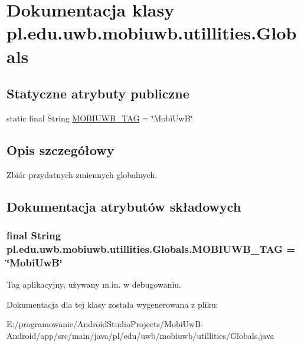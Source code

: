 \hypertarget{classpl_1_1edu_1_1uwb_1_1mobiuwb_1_1utillities_1_1_globals}{}\section{Dokumentacja klasy pl.\+edu.\+uwb.\+mobiuwb.\+utillities.\+Globals}
\label{classpl_1_1edu_1_1uwb_1_1mobiuwb_1_1utillities_1_1_globals}
\subsection*{Statyczne atrybuty publiczne}
\begin{DoxyCompactItemize}
\item 
static final String \hyperlink{classpl_1_1edu_1_1uwb_1_1mobiuwb_1_1utillities_1_1_globals_a698aecb51361b92a403621843030ca3c}{M\+O\+B\+I\+U\+W\+B\+\_\+\+T\+A\+G} = \char`\"{}Mobi\+Uw\+B\char`\"{}
\end{DoxyCompactItemize}


\subsection{Opis szczegółowy}
Zbiór przydatnych zmiennych globalnych. 

\subsection{Dokumentacja atrybutów składowych}
\hypertarget{classpl_1_1edu_1_1uwb_1_1mobiuwb_1_1utillities_1_1_globals_a698aecb51361b92a403621843030ca3c}{}
\subsubsection[{M\+O\+B\+I\+U\+W\+B\+\_\+\+T\+A\+G}]{\setlength{\rightskip}{0pt plus 5cm}final String pl.\+edu.\+uwb.\+mobiuwb.\+utillities.\+Globals.\+M\+O\+B\+I\+U\+W\+B\+\_\+\+T\+A\+G = \char`\"{}Mobi\+Uw\+B\char`\"{}\hspace{0.3cm}{\ttfamily [static]}}\label{classpl_1_1edu_1_1uwb_1_1mobiuwb_1_1utillities_1_1_globals_a698aecb51361b92a403621843030ca3c}
Tag aplikacyjny, używany m.\+in. w debugowaniu. 

Dokumentacja dla tej klasy została wygenerowana z pliku\+:\begin{DoxyCompactItemize}
\item 
E\+:/programowanie/\+Android\+Studio\+Projects/\+Mobi\+Uw\+B-\/\+Android/app/src/main/java/pl/edu/uwb/mobiuwb/utillities/Globals.\+java\end{DoxyCompactItemize}
